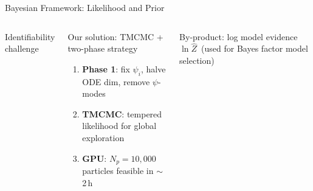 \documentclass[aspectratio=169,10pt,t]{beamer}
\begin{document}
\begin{frame}[t]{Bayesian Framework: Likelihood and Prior}
\begin{columns}[T]
\begin{block}{Identifiability challenge}
\begin{itemize}
        \end{itemize}
      \end{block}
      \vspace{6pt}
      \begin{alertblock}{Our solution: TMCMC + two-phase strategy}
        \begin{enumerate}\setlength{\itemsep}{2pt}
          \item \textbf{Phase 1}: fix $\psi_i$, halve ODE dim, remove $\psi$-modes
          \item \textbf{TMCMC}: tempered likelihood for global exploration
          \item \textbf{GPU}: $N_p=10{,}000$ particles feasible in $\sim$2\,h
        \end{enumerate}
      \end{alertblock}
      \vspace{4pt}
      By-product: log model evidence $\ln\hat Z$\,\;
      (used for Bayes factor model selection)
  \end{columns}
\end{frame}
\end{document}
